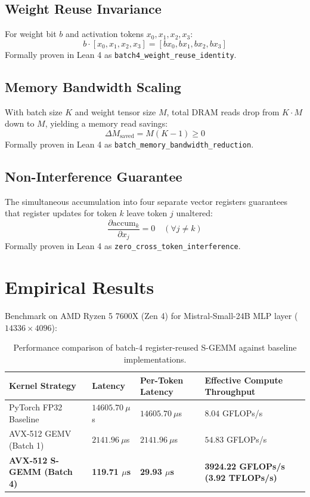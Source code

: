 \documentclass[11pt,a4paper]{article}
\begin{document}
\subsection{Weight Reuse Invariance}
For weight bit $b$ and activation tokens $x_0, x_1, x_2, x_3$:
\begin{equation}
b \cdot [x_0, x_1, x_2, x_3] = [b x_0, b x_1, b x_2, b x_3]
\end{equation}
Formally proven in Lean 4 as \texttt{batch4\_weight\_reuse\_identity}.

\subsection{Memory Bandwidth Scaling}
With batch size $K$ and weight tensor size $M$, total DRAM reads drop from $K \cdot M$ down to $M$, yielding a memory read savings:
\begin{equation}
\Delta M_{\text{saved}} = M(K - 1) \ge 0
\end{equation}
Formally proven in Lean 4 as \texttt{batch\_memory\_bandwidth\_reduction}.

\subsection{Non-Interference Guarantee}
The simultaneous accumulation into four separate vector registers guarantees that register updates for token $k$ leave token $j$ unaltered:
\begin{equation}
\frac{\partial \text{accum}_k}{\partial x_j} = 0 \quad (\forall j \neq k)
\end{equation}
Formally proven in Lean 4 as \texttt{zero\_cross\_token\_interference}.

\section{Empirical Results}

Benchmark on AMD Ryzen 5 7600X (Zen 4) for Mistral-Small-24B MLP layer ($14336 \times 4096$):

\begin{table}[h!]
\centering
\begin{tabular}{@{}llll@{}}
\toprule
\textbf{Kernel Strategy} & \textbf{Latency} & \textbf{Per-Token Latency} & \textbf{Effective Compute Throughput} \\ \midrule
PyTorch FP32 Baseline & $14605.70\ \mu$s & $14605.70\ \mu$s & $8.04$ GFLOPs/s \\
AVX-512 GEMV (Batch 1) & $2141.96\ \mu$s & $2141.96\ \mu$s & $54.83$ GFLOPs/s \\
\textbf{AVX-512 S-GEMM (Batch 4)} & \textbf{119.71 $\mu$s} & \textbf{29.93 $\mu$s} & \textbf{3924.22 GFLOPs/s (3.92 TFLOPs/s)} \\ \bottomrule
\end{tabular}
\caption{Performance comparison of batch-4 register-reused S-GEMM against baseline implementations.}
\end{table}
\end{document}

